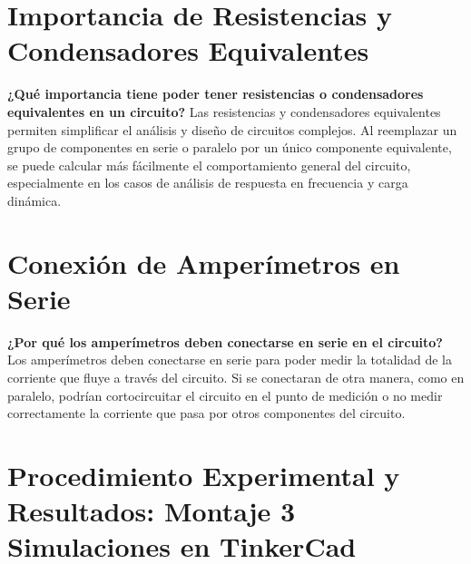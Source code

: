 \section{Importancia de Resistencias y Condensadores Equivalentes}
\textbf{¿Qué importancia tiene poder tener resistencias o condensadores equivalentes en un circuito?}
Las resistencias y condensadores equivalentes permiten simplificar el análisis y diseño de circuitos complejos. Al reemplazar un grupo de componentes en serie o paralelo por un único componente equivalente, se puede calcular más fácilmente el comportamiento general del circuito, especialmente en los casos de análisis de respuesta en frecuencia y carga dinámica.

\section{Conexión de Amperímetros en Serie}
\textbf{¿Por qué los amperímetros deben conectarse en serie en el circuito?}
Los amperímetros deben conectarse en serie para poder medir la totalidad de la corriente que fluye a través del circuito. Si se conectaran de otra manera, como en paralelo, podrían cortocircuitar el circuito en el punto de medición o no medir correctamente la corriente que pasa por otros componentes del circuito.

\section{Procedimiento Experimental y Resultados: Montaje 3 Simulaciones en TinkerCad}

